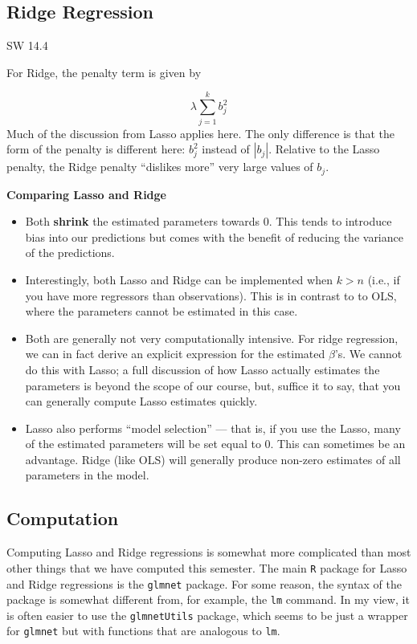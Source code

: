 \documentclass[
  letterpaper,
  DIV=11,
  numbers=noendperiod]{scrreprt}
\begin{document}
\subsection{Ridge Regression}\label{ridge-regression}

SW 14.4

For Ridge, the penalty term is given by

\[
  \lambda \sum_{j=1}^k b_j^2
\] Much of the discussion from Lasso applies here. The only difference
is that the form of the penalty is different here: \(b_j^2\) instead of
\(|b_j|\). Relative to the Lasso penalty, the Ridge penalty ``dislikes
more'' very large values of \(b_j\).

\textbf{Comparing Lasso and Ridge}

\begin{itemize}
\item
  Both \textbf{shrink} the estimated parameters towards 0. This tends to
  introduce bias into our predictions but comes with the benefit of
  reducing the variance of the predictions.
\item
  Interestingly, both Lasso and Ridge can be implemented when \(k > n\)
  (i.e., if you have more regressors than observations). This is in
  contrast to to OLS, where the parameters cannot be estimated in this
  case.
\item
  Both are generally not very computationally intensive. For ridge
  regression, we can in fact derive an explicit expression for the
  estimated \(\beta\)'s. We cannot do this with Lasso; a full discussion
  of how Lasso actually estimates the parameters is beyond the scope of
  our course, but, suffice it to say, that you can generally compute
  Lasso estimates quickly.
\item
  Lasso also performs ``model selection'' --- that is, if you use the
  Lasso, many of the estimated parameters will be set equal to 0. This
  can sometimes be an advantage. Ridge (like OLS) will generally produce
  non-zero estimates of all parameters in the model.
\end{itemize}

\subsection{Computation}\label{computation-10}

Computing Lasso and Ridge regressions is somewhat more complicated than
most other things that we have computed this semester. The main
\texttt{R} package for Lasso and Ridge regressions is the
\texttt{glmnet} package. For some reason, the syntax of the package is
somewhat different from, for example, the \texttt{lm} command. In my
view, it is often easier to use the \texttt{glmnetUtils} package, which
seems to be just a wrapper for \texttt{glmnet} but with functions that
are analogous to \texttt{lm}.
\end{document}
